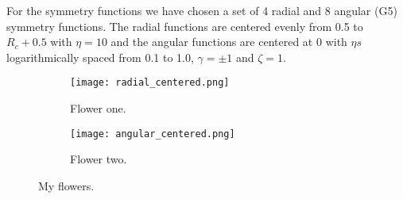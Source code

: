 For the symmetry functions we have chosen a set of 4 radial and 8 angular (G5)
symmetry functions. The radial functions are centered evenly from
0.5 to $R_c + 0.5$ with $\eta = 10$ and the angular functions
are centered at 0 with $\eta s$ logarithmically spaced from 0.1 to 1.0,
$\gamma = \pm 1$ and $\zeta = 1$.

\begin{figure}[!tbp]
\begin{adjustbox}{max width=1.2\linewidth,center}
\centering
  \begin{subfigure}[b]{0.55\textwidth}
      \texttt{[image: radial\_centered.png]}
    \caption{Flower one.}
    \label{fig:f1}
  \end{subfigure}
  \hfill
  \begin{subfigure}[b]{0.55\textwidth}
      \texttt{[image: angular\_centered.png]}
    \caption{Flower two.}
    \label{fig:f2}
  \end{subfigure}
\end{adjustbox}
\caption{My flowers.}
\end{figure}



